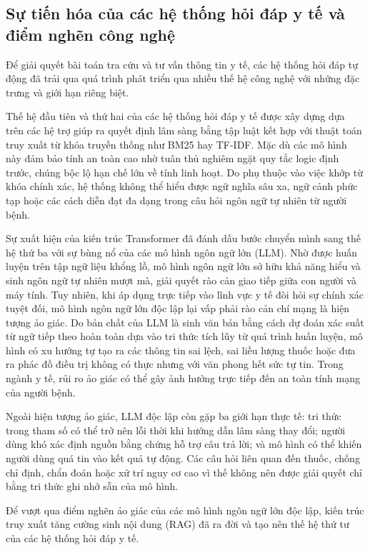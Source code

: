 \subsection{Sự tiến hóa của các hệ thống hỏi đáp y tế và điểm nghẽn công nghệ}
Để giải quyết bài toán tra cứu và tư vấn thông tin y tế, các hệ thống hỏi đáp tự động đã trải qua quá trình phát triển qua nhiều thế hệ công nghệ với những đặc trưng và giới hạn riêng biệt.

Thế hệ đầu tiên và thứ hai của các hệ thống hỏi đáp y tế được xây dựng dựa trên các hệ trợ giúp ra quyết định lâm sàng bằng tập luật \cite{rule_based_1, rule_based_2} kết hợp với thuật toán truy xuất từ khóa truyền thống như BM25 hay TF-IDF. Mặc dù các mô hình này đảm bảo tính an toàn cao nhờ tuân thủ nghiêm ngặt quy tắc logic định trước, chúng bộc lộ hạn chế lớn về tính linh hoạt. Do phụ thuộc vào việc khớp từ khóa chính xác, hệ thống không thể hiểu được ngữ nghĩa sâu xa, ngữ cảnh phức tạp hoặc các cách diễn đạt đa dạng trong câu hỏi ngôn ngữ tự nhiên từ người bệnh.

Sự xuất hiện của kiến trúc Transformer \cite{vaswani2017} đã đánh dấu bước chuyển mình sang thế hệ thứ ba với sự bùng nổ của các mô hình ngôn ngữ lớn (LLM). Nhờ được huấn luyện trên tập ngữ liệu khổng lồ, mô hình ngôn ngữ lớn sở hữu khả năng hiểu và sinh ngôn ngữ tự nhiên mượt mà, giải quyết rào cản giao tiếp giữa con người và máy tính. Tuy nhiên, khi áp dụng trực tiếp vào lĩnh vực y tế đòi hỏi sự chính xác tuyệt đối, mô hình ngôn ngữ lớn độc lập lại vấp phải rào cản chí mạng là hiện tượng ảo giác. Do bản chất của LLM là sinh văn bản bằng cách dự đoán xác suất từ ngữ tiếp theo hoàn toàn dựa vào tri thức tích lũy từ quá trình huấn luyện, mô hình có xu hướng tự tạo ra các thông tin sai lệch, sai liều lượng thuốc hoặc đưa ra phác đồ điều trị không có thực nhưng với văn phong hết sức tự tin. Trong ngành y tế, rủi ro ảo giác có thể gây ảnh hưởng trực tiếp đến an toàn tính mạng của người bệnh.

Ngoài hiện tượng ảo giác, LLM độc lập còn gặp ba giới hạn thực tế: tri thức trong tham số có thể trở nên lỗi thời khi hướng dẫn lâm sàng thay đổi; người dùng khó xác định nguồn bằng chứng hỗ trợ câu trả lời; và mô hình có thể khiến người dùng quá tin vào kết quả tự động. Các câu hỏi liên quan đến thuốc, chống chỉ định, chẩn đoán hoặc xử trí nguy cơ cao vì thế không nên được giải quyết chỉ bằng tri thức ghi nhớ sẵn của mô hình.




Để vượt qua điểm nghẽn ảo giác của các mô hình ngôn ngữ lớn độc lập, kiến trúc truy xuất tăng cường sinh nội dung (RAG) \cite{lewis2020, karpukhin2020} đã ra đời và tạo nên thế hệ thứ tư của các hệ thống hỏi đáp y tế.

